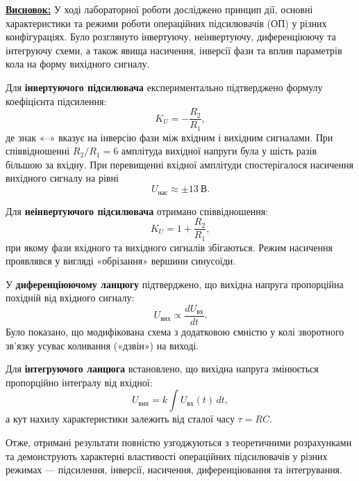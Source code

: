 \documentclass[12pt,a4paper]{article}
\begin{document}
    \setlength{\parindent}{0em}

    \textbf{\underline{Висновок:}} У ході лабораторної роботи досліджено принцип дії, основні характеристики та режими роботи операційних підсилювачів (ОП) у різних конфігураціях. Було розглянуто інвертуючу, неінвертуючу, диференціюючу та інтегруючу схеми, а також явища насичення, інверсії фази та вплив параметрів кола на форму вихідного сигналу.

    \setlength{\parindent}{1.5em}

Для \textbf{інвертуючого підсилювача} експериментально підтверджено формулу коефіцієнта підсилення:
\[
\displaystyle K_U = -\frac{R_2}{R_1},
\]
де знак «–» вказує на інверсію фази між вхідним і вихідним сигналами. При співвідношенні $R_2/R_1 = 6$ амплітуда вихідної напруги була у шість разів більшою за вхідну. При перевищенні вхідної амплітуди спостерігалося насичення вихідного сигналу на рівні
\[
U_{\text{нас}} \approx \pm 13~\text{В}.
\]

Для \textbf{неінвертуючого підсилювача} отримано співвідношення:
\[
\displaystyle K_U = 1 + \frac{R_2}{R_1},
\]
при якому фази вхідного та вихідного сигналів збігаються. Режим насичення проявлявся у вигляді «обрізання» вершини синусоїди.

У \textbf{диференціюючому ланцюгу} підтверджено, що вихідна напруга пропорційна похідній від вхідного сигналу:
\[
\displaystyle U_{\text{вих}} \propto \frac{dU_{\text{вх}}}{dt}.
\]
Було показано, що модифікована схема з додатковою ємністю у колі зворотного зв’язку усуває коливання («дзвін») на виході.

Для \textbf{інтегруючого ланцюга} встановлено, що вихідна напруга змінюється пропорційно інтегралу від вхідної:
\[
\displaystyle U_{\text{вих}} = k \int U_{\text{вх}}(t)\,dt,
\]
а кут нахилу характеристики залежить від сталої часу $\tau = RC$.

Отже, отримані результати повністю узгоджуються з теоретичними розрахунками та демонструють характерні властивості операційних підсилювачів у різних режимах — підсилення, інверсії, насичення, диференціювання та інтегрування.
\end{document}
